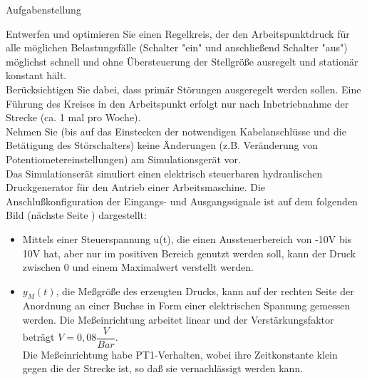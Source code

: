 \documentclass[11pt, a4paper,parskip=half]{report}
\begin{document}
\pagestyle{fancy}






\newpage
\begin{huge}
Aufgabenstellung\\

\end{huge}
Entwerfen und optimieren Sie einen Regelkreis, der den Arbeitspunktdruck für alle möglichen Belastungsfälle (Schalter "ein" und anschließend Schalter "aus") möglichst schnell und ohne Übersteuerung der Stellgröße ausregelt und stationär konstant hält.\\

Berücksichtigen Sie dabei, dass primär Störungen ausgeregelt werden sollen. Eine Führung des Kreises in den Arbeitspunkt erfolgt nur nach Inbetriebnahme der Strecke (ca. 1 mal pro Woche).\\

Nehmen Sie (bis auf das Einstecken der notwendigen Kabelanschlüsse und die Betätigung des Störschalters) keine Änderungen (z.B. Veränderung von Potentiometereinstellungen) am Simulationsgerät vor.\\

Das Simulationserät simuliert einen elektrisch steuerbaren hydraulischen Druckgenerator für den Antrieb einer Arbeitsmaschine. Die Anschlußkonfiguration der Eingangs- und Ausgangssignale ist auf dem folgenden Bild (nächste Seite ) dargestellt:\\

\begin{itemize}
\item Mittels einer Steuerspannung u(t), die einen Aussteuerbereich von -10V bis 10V hat, aber nur im positiven Bereich genutzt werden soll, kann der Druck zwischen 0 und einem Maximalwert verstellt werden.

\item $y_{M} (t)$, die Meßgröße des erzeugten Drucks, kann auf der rechten Seite der Anordnung an einer Buchse in Form einer elektrischen Spannung gemessen werden. Die Meßeinrichtung arbeitet linear und der Verstärkungsfaktor beträgt $V =0,08 \dfrac{V}{Bar}$.\\
Die Meßeinrichtung habe PT1-Verhalten, wobei ihre Zeitkonstante klein gegen die der Strecke ist, so daß sie vernachlässigt werden kann.

\end{itemize}
\end{document}
